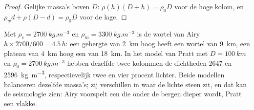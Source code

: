 \begin{proof}
Gelijke massa's boven $D$: $\rho(h)(D + h) = \rho_0 D$ voor de hoge kolom, en
$\rho_w d + \rho(D - d) = \rho_0 D$ voor de lage.
\end{proof}

Met $\rho_c = \qty{2700}{kg.m^{-3}}$ en $\rho_m = \qty{3300}{kg.m^{-3}}$ is de wortel van Airy $h\times2700/600 = 4.5\,h$: een gebergte van \qty{2}{km} hoog heeft een wortel van \qty{9}{km}, een plateau van \qty{4}{km} hoog een van \qty{18}{km}. In het model van Pratt met $D = \qty{100}{km}$ en $\rho_0 = \qty{2700}{kg.m^{-3}}$ hebben dezelfde twee kolommen de dichtheden 2647 en \qty{2596}{kg.m^{-3}}, respectievelijk twee en vier procent lichter. Beide modellen balanceren dezelfde massa's; zij verschillen in waar de lichte steen zit, en dat kan de seismologie zien: Airy voorspelt een  die onder de bergen dieper wordt, Pratt een vlakke.

